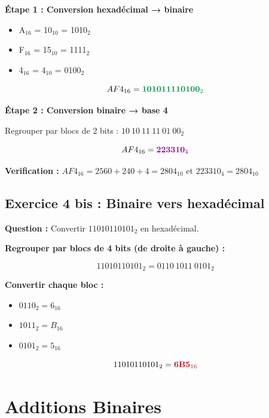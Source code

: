 \documentclass[12pt,a4paper]{article}
\begin{document}
\begin{solution}
\textbf{Étape 1 : Conversion hexadécimal → binaire}

\begin{itemize}
    \item A$_{16}$ = 10$_{10}$ = 1010$_2$
    \item F$_{16}$ = 15$_{10}$ = 1111$_2$
    \item 4$_{16}$ = 4$_{10}$ = 0100$_2$
\end{itemize}

$$AF4_{16} = \textcolor{defvert}{\textbf{101011110100}_2}$$

\textbf{Étape 2 : Conversion binaire → base 4}

Regrouper par blocs de 2 bits : $10\ 10\ 11\ 11\ 01\ 00_2$

$$AF4_{16} = \textcolor{algoviolet}{\textbf{223310}_4}$$

\textbf{Verification :} $AF4_{16} = 2560 + 240 + 4 = 2804_{10}$ et $223310_4 = 2804_{10}$
\end{solution}

\newpage
\subsection{Exercice 4 bis : Binaire vers hexadécimal}

\begin{exercice}
\textbf{Question :} Convertir $11010110101_2$ en hexadécimal.
\end{exercice}

\begin{solution}
\textbf{Regrouper par blocs de 4 bits (de droite à gauche) :}

$$11010110101_2 = 0110\ 1011\ 0101_2$$

\textbf{Convertir chaque bloc :}
\begin{itemize}
    \item $0110_2 = 6_{16}$
    \item $1011_2 = B_{16}$
    \item $0101_2 = 5_{16}$
\end{itemize}

$$11010110101_2 = \textcolor{importantrouge}{\textbf{6B5}_{16}}$$
\end{solution}

\newpage
\section{Additions Binaires}
\end{document}
